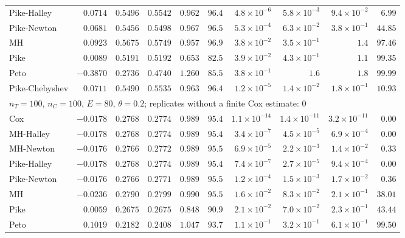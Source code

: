 \begin{landscape}
\begin{longtable}{lrrrrrrrrr}
Pike-Halley & $0.0714$ & $0.5496$ & $0.5542$ & $0.962$ & $96.4$ & $4.8 \times 10^{-6}$ & $5.8 \times 10^{-3}$ & $9.4 \times 10^{-2}$ & $6.99$ \\
Pike-Newton & $0.0681$ & $0.5456$ & $0.5498$ & $0.967$ & $96.5$ & $5.3 \times 10^{-4}$ & $6.3 \times 10^{-2}$ & $3.8 \times 10^{-1}$ & $44.85$ \\
MH & $0.0923$ & $0.5675$ & $0.5749$ & $0.957$ & $96.9$ & $3.8 \times 10^{-2}$ & $3.5 \times 10^{-1}$ & $1.4$ & $97.46$ \\
Pike & $0.0089$ & $0.5191$ & $0.5192$ & $0.653$ & $82.5$ & $3.9 \times 10^{-2}$ & $4.3 \times 10^{-1}$ & $1.1$ & $99.35$ \\
Peto & $-0.3870$ & $0.2736$ & $0.4740$ & $1.260$ & $85.5$ & $3.8 \times 10^{-1}$ & $1.6$ & $1.8$ & $99.99$ \\
Pike-Chebyshev & $0.0711$ & $0.5490$ & $0.5535$ & $0.963$ & $96.4$ & $1.2 \times 10^{-5}$ & $1.4 \times 10^{-2}$ & $1.8 \times 10^{-1}$ & $10.93$ \\
\multicolumn{10}{l}{$n_T = 100$, $n_C = 100$, $E = 80$, $\theta = 0.2$; replicates without a finite Cox estimate: 0} \\
Cox & $-0.0178$ & $0.2768$ & $0.2774$ & $0.989$ & $95.4$ & $1.1 \times 10^{-14}$ & $1.4 \times 10^{-11}$ & $3.2 \times 10^{-11}$ & $0.00$ \\
MH-Halley & $-0.0178$ & $0.2768$ & $0.2774$ & $0.989$ & $95.4$ & $3.4 \times 10^{-7}$ & $4.5 \times 10^{-5}$ & $6.9 \times 10^{-4}$ & $0.00$ \\
MH-Newton & $-0.0176$ & $0.2766$ & $0.2772$ & $0.989$ & $95.5$ & $6.9 \times 10^{-5}$ & $2.2 \times 10^{-3}$ & $1.4 \times 10^{-2}$ & $0.33$ \\
Pike-Halley & $-0.0178$ & $0.2768$ & $0.2774$ & $0.989$ & $95.4$ & $7.4 \times 10^{-7}$ & $2.7 \times 10^{-5}$ & $9.4 \times 10^{-4}$ & $0.00$ \\
Pike-Newton & $-0.0176$ & $0.2766$ & $0.2771$ & $0.989$ & $95.5$ & $1.2 \times 10^{-4}$ & $1.5 \times 10^{-3}$ & $1.7 \times 10^{-2}$ & $0.36$ \\
MH & $-0.0236$ & $0.2790$ & $0.2799$ & $0.990$ & $95.5$ & $1.6 \times 10^{-2}$ & $8.3 \times 10^{-2}$ & $2.1 \times 10^{-1}$ & $38.01$ \\
Pike & $0.0059$ & $0.2675$ & $0.2675$ & $0.848$ & $90.9$ & $2.1 \times 10^{-2}$ & $7.0 \times 10^{-2}$ & $2.3 \times 10^{-1}$ & $43.44$ \\
Peto & $0.1019$ & $0.2182$ & $0.2408$ & $1.047$ & $93.7$ & $1.1 \times 10^{-1}$ & $3.2 \times 10^{-1}$ & $6.1 \times 10^{-1}$ & $99.50$ \\

\end{longtable}
\end{landscape}

